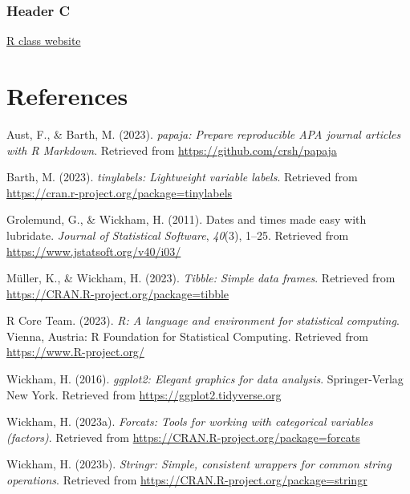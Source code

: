 \documentclass[
  man]{apa6}
\newlength{\cslhangindent}
\newlength{\cslentryspacingunit} %
\newenvironment{CSLReferences}[2] %
 {%
  \setlength{\parindent}{0pt}
  \ifodd #1
  \let\oldpar\par
  \def\par{\hangindent=\cslhangindent\oldpar}
  \fi
  \setlength{\parskip}{#2\cslentryspacingunit}
 }%
 {}
\begin{document}
\hypertarget{header-c}{%
\subsubsection{Header C}\label{header-c}}

\href{https://nrdowling.github.io/d2m/index.html}{R class website}

\newpage

\hypertarget{references}{%
\section{References}\label{references}}

\hypertarget{refs}{}
\begin{CSLReferences}{1}{0}
\leavevmode{}%
Aust, F., \& Barth, M. (2023). \emph{{papaja}: {Prepare} reproducible {APA} journal articles with {R Markdown}}. Retrieved from \url{https://github.com/crsh/papaja}

\leavevmode{}%
Barth, M. (2023). \emph{{tinylabels}: Lightweight variable labels}. Retrieved from \url{https://cran.r-project.org/package=tinylabels}

\leavevmode{}%
Grolemund, G., \& Wickham, H. (2011). Dates and times made easy with {lubridate}. \emph{Journal of Statistical Software}, \emph{40}(3), 1--25. Retrieved from \url{https://www.jstatsoft.org/v40/i03/}

\leavevmode{}%
Müller, K., \& Wickham, H. (2023). \emph{Tibble: Simple data frames}. Retrieved from \url{https://CRAN.R-project.org/package=tibble}

\leavevmode{}%
R Core Team. (2023). \emph{R: A language and environment for statistical computing}. Vienna, Austria: R Foundation for Statistical Computing. Retrieved from \url{https://www.R-project.org/}

\leavevmode{}%
Wickham, H. (2016). \emph{ggplot2: Elegant graphics for data analysis}. Springer-Verlag New York. Retrieved from \url{https://ggplot2.tidyverse.org}

\leavevmode{}%
Wickham, H. (2023a). \emph{Forcats: Tools for working with categorical variables (factors)}. Retrieved from \url{https://CRAN.R-project.org/package=forcats}

\leavevmode{}%
Wickham, H. (2023b). \emph{Stringr: Simple, consistent wrappers for common string operations}. Retrieved from \url{https://CRAN.R-project.org/package=stringr}


\end{CSLReferences}
\end{document}
